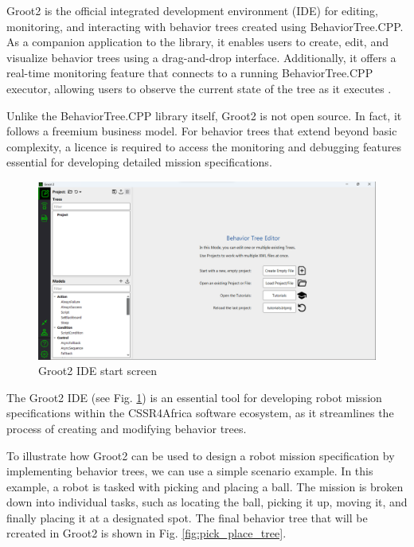 \documentclass{CSSRforAfrica}
\begin{document}
Groot2 is the official integrated development environment (IDE) for editing, monitoring, and interacting with behavior trees created using BehaviorTree.CPP. As a companion application to the library, it enables users to create, edit, and visualize behavior trees using a drag-and-drop interface. Additionally, it offers a real-time monitoring feature that connects to a running BehaviorTree.CPP executor, allowing users to observe the current state of the tree as it executes \cite{BehaviorTreeWebsite}.

Unlike the BehaviorTree.CPP library itself, Groot2 is not open source. In fact, it follows a freemium business model. For behavior trees that extend beyond basic complexity, a licence is required to access the monitoring and debugging features essential for developing detailed mission specifications.

\begin{figure}[h]
    \centering
    \includegraphics[width=120mm]{images/groot2_start.png}
    \caption{Groot2 IDE start screen}
    \label{fig:groo2_start}
\end{figure}

The Groot2 IDE (see Fig. \ref{fig:groo2_start}) is an essential tool for developing robot mission specifications within the CSSR4Africa software ecosystem, as it streamlines the process of creating and modifying behavior trees. 

To illustrate how Groot2 can be used to design a robot mission specification by implementing behavior trees, we can use a simple scenario example. In this example, a robot is tasked with picking and placing a ball. The mission is broken down into individual tasks, such as locating the ball, picking it up, moving it, and finally placing it at a designated spot. The final behavior tree that will be rcreated in Groot2 is shown in Fig. \ref{fig:pick_place_tree}.
\end{document}
